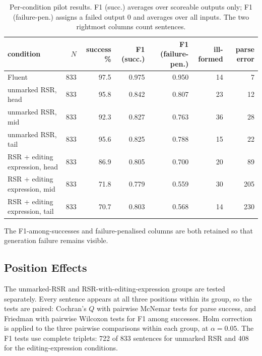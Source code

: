 \begin{table}[ht]
\centering
\small
\begin{tabular}{lrrrrrr}
\toprule
condition & $N$ & success \% & F1 (succ.) & F1 (failure-pen.) & ill-formed & parse error \\
\midrule
Fluent                     & 833 & 97.5 & 0.975 & 0.950 & 14 &   7 \\
\addlinespace
unmarked RSR, head         & 833 & 95.8 & 0.842 & 0.807 & 23 &  12 \\
unmarked RSR, mid          & 833 & 92.3 & 0.827 & 0.763 & 36 &  28 \\
unmarked RSR, tail         & 833 & 95.6 & 0.825 & 0.788 & 15 &  22 \\
\addlinespace
RSR + editing expression, head & 833 & 86.9 & 0.805 & 0.700 & 20 &  89 \\
RSR + editing expression, mid  & 833 & 71.8 & 0.779 & 0.559 & 30 & 205 \\
RSR + editing expression, tail & 833 & 70.7 & 0.803 & 0.568 & 14 & 230 \\
\bottomrule
\end{tabular}
\caption{Per-condition pilot results. F1 (succ.) averages over scoreable
outputs only; F1 (failure-pen.) assigns a failed output 0 and averages over all
inputs. The two rightmost columns count sentences.}
\label{tab:pilot-full}
\end{table}

The F1-among-successes and failure-penalised columns are both retained so that generation failure remains visible.

\subsection{Position Effects}

The unmarked-RSR and RSR-with-editing-expression groups are tested separately. Every sentence
appears at all three positions within its group, so the tests are paired:
Cochran's $Q$ with pairwise McNemar tests for parse success, and Friedman with
pairwise Wilcoxon tests for F1 among successes. Holm correction is applied to
the three pairwise comparisons within each group, at $\alpha = 0.05$. The F1
tests use complete triplets: 722 of 833 sentences for unmarked RSR and 408 for
the editing-expression conditions.

